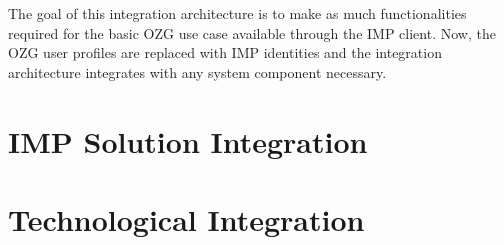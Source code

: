 
The goal of this integration architecture is to make as much functionalities required for the basic OZG use case available through the IMP client. Now, the OZG user profiles are replaced with IMP identities and the integration architecture integrates with any system component necessary.

\section{IMP Solution Integration}



\section{Technological Integration}


